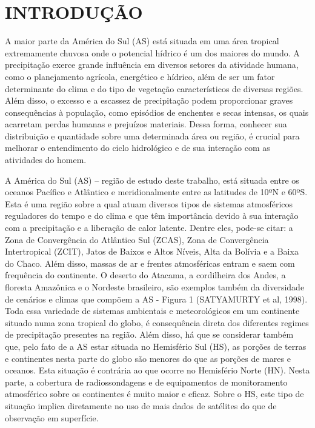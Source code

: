 \hypertarget{estilo:capitulo}{}
\chapter{INTRODUÇÃO} 

A maior parte da América do Sul (AS) está situada em uma área tropical extremamente chuvosa onde o potencial hídrico é um dos maiores do mundo. A precipitação exerce grande influência em diversos setores da atividade humana, como o planejamento agrícola, energético e hídrico, além de ser um fator determinante do clima e do tipo de vegetação característicos de diversas regiões. Além disso, o excesso e a escassez de precipitação podem proporcionar graves consequências à população, como episódios de enchentes e secas intensas, os quais acarretam perdas humanas e prejuízos materiais. Dessa forma, conhecer sua distribuição e quantidade sobre uma determinada área ou região, é crucial para melhorar o entendimento do ciclo hidrológico e de sua interação com as atividades do homem.

A América do Sul (AS) – região de estudo deste trabalho, está situada entre os oceanos Pacífico e Atlântico e meridionalmente entre as latitudes de 10ºN e 60ºS. Esta é uma região sobre a qual atuam diversos tipos de sistemas atmosféricos reguladores do tempo e do clima e que têm importância devido à sua interação com a precipitação e a liberação de calor latente. Dentre eles, pode-se citar: a Zona de Convergência do Atlântico Sul (ZCAS), Zona de Convergência Intertropical (ZCIT), Jatos de Baixos e Altos Níveis, Alta da Bolívia e a Baixa do Chaco. Além disso, massas de ar e frentes atmosféricas entram e saem com frequência do continente. O deserto do Atacama, a cordilheira dos Andes, a floresta Amazônica e o Nordeste brasileiro, são exemplos também da diversidade de cenários e climas que compõem a AS - Figura 1 (SATYAMURTY et al, 1998). Toda essa variedade de sistemas ambientais e meteorológicos em um continente situado numa zona tropical do globo, é consequência direta dos diferentes regimes de precipitação presentes na região. Além disso, há que se considerar também que, pelo fato de a AS estar situada no Hemisfério Sul (HS), as porções de terras e continentes nesta parte do globo são menores do que as porções de mares e oceanos. Esta situação é contrária ao que ocorre no Hemisfério Norte (HN). Nesta parte, a cobertura de radiossondagens e de equipamentos de monitoramento atmosférico sobre os continentes é muito maior e eficaz. Sobre o HS, este tipo de situação implica diretamente no uso de mais dados de satélites do que de observação em superfície.

